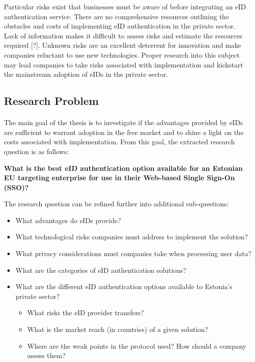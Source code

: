 Particular risks exist that businesses must be aware of before integrating an eID authentication service. There are no comprehensive resources outlining the obstacles and costs of implementing eID authentication in the private sector. Lack of information makes it difficult to assess risks and estimate the resources required [?]. Unknown risks are an excellent deterrent for innovation and make companies reluctant to use new technologies. Proper research into this subject may lead companies to take risks associated with implementation and kickstart the mainstream adoption of eIDs in the private sector. 


\subsection{Research Problem}
\paragraph{}

The main goal of the thesis is to investigate if the advantages provided by eIDs are sufficient to warrant adoption in the free market and to shine a light on the costs associated with implementation. From this goal, the extracted research question is as follows: 

\textbf{What is the best eID authentication option available for an Estonian EU targeting enterprise for use in their Web-based Single Sign-On (SSO)?}

The research question can be refined further into additional sub-questions:

\begin{itemize}
    \item What advantages do eIDs provide?
    \item What technological risks companies must address to implement the solution?
    \item What privacy considerations must companies take when processing user data?
    \item What are the categories of eID authentication solutions?
    \item What are the different eID authentication options available to Estonia's private sector?
    \begin{itemize}
        \item What risks the eID provider transfers?
        \item What is the market reach (in countries) of a given solution?
        \item Where are the weak points in the protocol used? How should a company assess them?
    \end{itemize}
\end{itemize}


